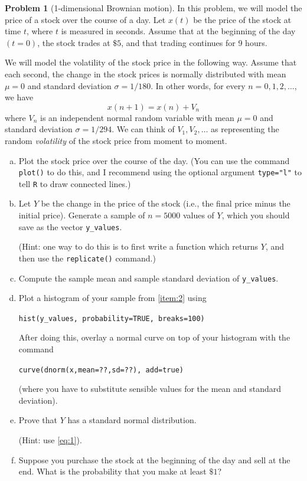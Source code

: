 \documentclass[10pt]{article}
\theoremstyle{definition}
\newtheorem{problem}[theorem]{Problem}
\begin{document}
\begin{problem}[1-dimensional Brownian motion]
  In this problem, we will model the price of a stock over the course of a
  day. Let $x(t)$ be the price of the stock at time $t$, where $t$ is
  measured in seconds. Assume that at the beginning of the day $(t=0)$, the
  stock trades at $\$5$, and that trading continues for 9 hours.

  We will model the volatility of the stock price in the following way. Assume
  that each second, the change in the stock prices is normally distributed
  with mean $\mu=0$ and standard deviation $\sigma = 1/180$. In other words,
  for every $n=0,1,2,\ldots$, we have
  \begin{equation}\label{eq:1}
    x(n+1)= x(n)+V_{n}
  \end{equation}
  where $V_{n}$ is an independent normal random variable with mean $\mu=0$ and
  standard deviation $\sigma=1/294$. We can think of $V_{1},V_{2},\ldots$ as
  representing the random \textit{volatility} of the stock price from moment
  to moment.

  
  \begin{enumerate}[(a)]
    \item Plot the stock price over the course of the day. (You can use the
    command \texttt{plot()} to do this, and I recommend using the optional
    argument \texttt{type="l"} to tell \texttt{R} to draw connected lines.)
    \item \label{item:2} Let $Y$ be the change in the price of the stock
    (i.e., the final price minus the initial price). Generate a sample of
    $n=5000$ values of $Y$, which you should save as the vector \texttt{y_values}.

    (Hint: one way to do this is to first write a function which returns $Y$,
    and then use the \texttt{replicate()} command.)
    \item Compute the sample mean and sample standard deviation of \texttt{y_values}.
    \item Plot a histogram of your sample from \ref{item:2} using
    \begin{center}
      \texttt{hist(y_values, probability=TRUE, breaks=100)}
    \end{center}
    After doing this, overlay a normal curve on top of your histogram with the command
    \begin{center}
      \texttt{curve(dnorm(x,mean=??,sd=??), add=true)}
    \end{center}
    (where you have to substitute sensible values for the mean and standard deviation).
    
    \item Prove that $Y$ has a standard normal distribution.

    (Hint: use \cref{eq:1}).
    \item Suppose you purchase the stock at the beginning of the day and sell
    at the end. What is the probability that you make at least $\$1$?
  \end{enumerate}
\end{problem}
\end{document}
